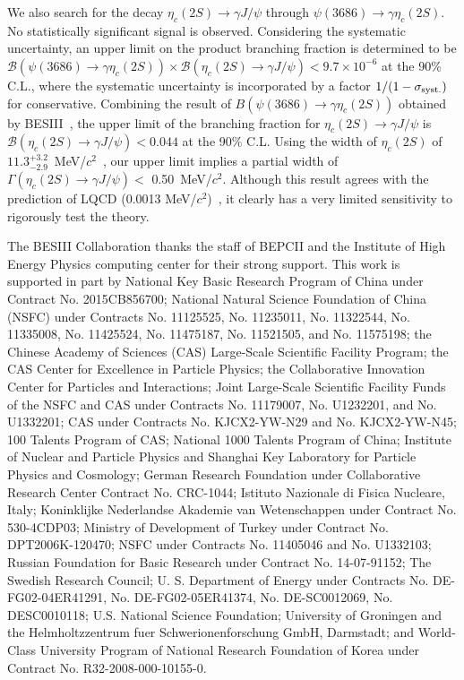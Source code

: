 \documentclass[prd,twocolumn,showpacs,amsmath,amssymb]{revtex4-1}
\begin{document}
We also search for the decay $\eta_{c}(2S)\rightarrow\gamma J/\psi$ through $\psi(3686)\rightarrow\gamma\eta_{c}(2S)$.
No statistically significant signal is observed. Considering the systematic uncertainty,
an upper limit on the product branching fraction is determined to be $\mathcal{B}(\psi(3686)\rightarrow\gamma\eta_{c}(2S))\times\mathcal{B}(\eta_{c}(2S)\rightarrow\gamma J/\psi) < 9.7\times 10^{-6}$ at the 90\% C.L., where the systematic uncertainty is incorporated by a factor $1/(1-\sigma_{\rm syst.})$ for conservative.
Combining the result of $B(\psi(3686)\to\gamma\eta_c(2S))$ obtained by BESIII~\cite{wangll}, the upper limit of the branching fraction for $\eta_c(2S)\to\gamma J/\psi$ is
$\mathcal{B}(\eta_{c}(2S)\rightarrow\gamma J/\psi) < 0.044$ at the 90\% C.L. Using the width of $\eta_c(2S)$ of $11.3^{+3.2}_{-2.9}$~MeV/$c^2$~\cite{PDG}, our upper limit
implies a partial width of $\Gamma(\eta_{c}(2S)\rightarrow\gamma J/\psi) <$ 0.50~MeV/$c^2$. Although this result agrees with the prediction of LQCD (0.0013 MeV/$c^2$)~\cite{LQCDpredict2},
it clearly has a very limited sensitivity to rigorously test the theory.

\acknowledgements

The BESIII Collaboration thanks the staff of BEPCII and the Institute of High Energy Physics computing center for their strong support. This work is supported in part by National Key Basic Research Program of China under Contract No. 2015CB856700; National Natural Science Foundation of China (NSFC) under Contracts No. 11125525, No. 11235011, No. 11322544, No. 11335008, No. 11425524, No. 11475187, No. 11521505, and No. 11575198; the Chinese Academy of Sciences (CAS) Large-Scale Scientific Facility Program; the CAS Center for Excellence in Particle Physics; the Collaborative Innovation Center for Particles and Interactions; Joint Large-Scale Scientific Facility Funds of the NSFC and CAS under Contracts No. 11179007, No. U1232201, and No. U1332201; CAS under Contracts No. KJCX2-YW-N29 and No. KJCX2-YW-N45; 100 Talents Program of CAS; National 1000 Talents Program of China; Institute of Nuclear and Particle Physics and Shanghai Key Laboratory for Particle Physics and Cosmology; German Research Foundation under Collaborative Research Center Contract No. CRC-1044; Istituto Nazionale di Fisica Nucleare, Italy; Koninklijke Nederlandse Akademie van Wetenschappen under Contract No. 530-4CDP03; Ministry of Development of Turkey under Contract No. DPT2006K-120470; NSFC under Contracts No. 11405046 and No. U1332103; Russian Foundation for Basic Research under Contract No. 14-07-91152; The Swedish Research Council; U. S. Department of Energy under Contracts No. DE-FG02-04ER41291, No. DE-FG02-05ER41374, No. DE-SC0012069, No. DESC0010118; U.S. National Science Foundation; University of Groningen and the Helmholtzzentrum fuer Schwerionenforschung GmbH, Darmstadt; and World-Class University Program of National Research Foundation of Korea under Contract No. R32-2008-000-10155-0.
\end{document}
